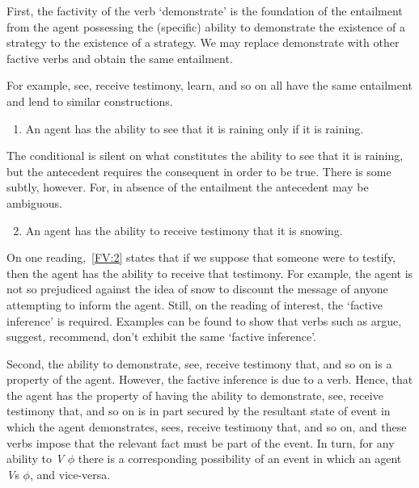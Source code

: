 \documentclass[10pt]{article}
\begin{document}
\begin{note}
  First, the factivity of the verb `demonstrate' is the foundation of the entailment from the agent possessing the (specific) ability to demonstrate the existence of a strategy to the existence of a strategy.
  We may replace demonstrate with other factive verbs and obtain the same entailment.

  For example, see, receive testimony, learn, and so on all have the same entailment and lend to similar constructions.
  \begin{enumerate}[label=(FV\arabic*), ref=(FV\arabic*)]
  \item\label{FV:1} An agent has the ability to see that it is raining only if it is raining.
  \end{enumerate}
  The conditional is silent on what constitutes the ability to see that it is raining, but the antecedent requires the consequent in order to be true.
  There is some subtly, however.
  For, in absence of the entailment the antecedent may be ambiguous.
  \begin{enumerate}[label=(FV\arabic*), ref=(FV\arabic*)]
    \setcounter{enumi}{1}
  \item\label{FV:2} An agent has the ability to receive testimony that it is snowing.
  \end{enumerate}
  On one reading,~\ref{FV:2} states that if we suppose that someone were to testify, then the agent has the ability to receive that testimony.
  For example, the agent is not so prejudiced against the idea of snow to discount the message of anyone attempting to inform the agent.
  Still, on the reading of interest, the `factive inference' is required.
  Examples can be found to show that verbs such as argue, suggest, recommend, don't exhibit the same `factive inference'.
\end{note}

\begin{note}
  Second, the ability to demonstrate, see, receive testimony that, and so on is a property of the agent.
  However, the factive inference is due to a verb.
  Hence, that the agent has the property of having the ability to demonstrate, see, receive testimony that, and so on is in part secured by the resultant state of event in which the agent demonstrates, sees, receive testimony that, and so on, and these verbs impose that the relevant fact must be part of the event.
  In turn, for any ability to \emph{V} \(\phi\) there is a corresponding possibility of an event in which an agent \emph{V}s \(\phi\), and vice-versa.
\end{note}
\end{document}
